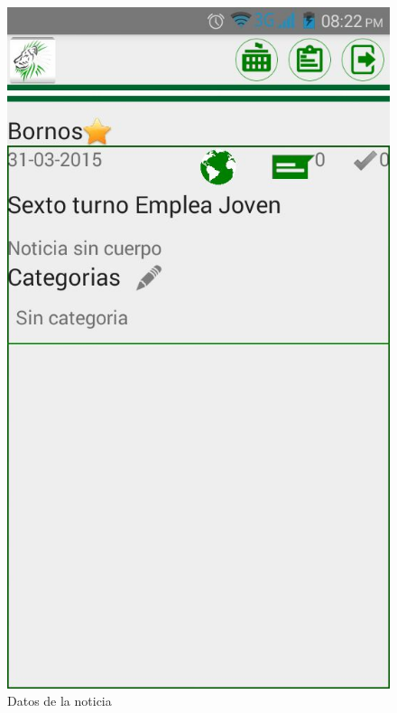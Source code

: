 \begin{figure}
\centering
\includegraphics[scale=0.5]{./android/imagenes/cat1.jpg}
\caption{Datos de la noticia}
\label{cat1}
\end{figure}


